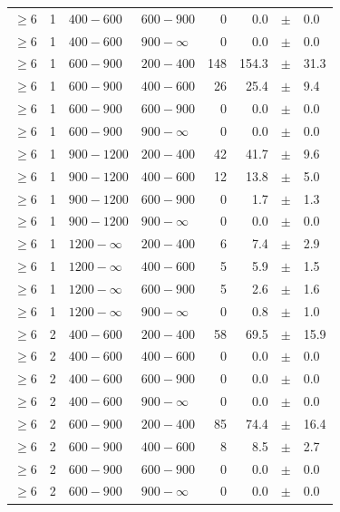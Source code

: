 \begin{table}[!h]
\begin{tabular}{rrllrrcl}
$\geq 6$ & 1 & $ 400- 600$ & $600-900$ &      0 &      0.0 &$\pm$&    0.0 \\
$\geq 6$ & 1 & $ 400- 600$ & $900-\infty$ &      0 &      0.0 &$\pm$&    0.0 \\
$\geq 6$ & 1 & $ 600- 900$ & $200-400$ &    148 &    154.3 &$\pm$&   31.3 \\
$\geq 6$ & 1 & $ 600- 900$ & $400-600$ &     26 &     25.4 &$\pm$&    9.4 \\
$\geq 6$ & 1 & $ 600- 900$ & $600-900$ &      0 &      0.0 &$\pm$&    0.0 \\
$\geq 6$ & 1 & $ 600- 900$ & $900-\infty$ &      0 &      0.0 &$\pm$&    0.0 \\
$\geq 6$ & 1 & $ 900-1200$ & $200-400$ &     42 &     41.7 &$\pm$&    9.6 \\
$\geq 6$ & 1 & $ 900-1200$ & $400-600$ &     12 &     13.8 &$\pm$&    5.0 \\
$\geq 6$ & 1 & $ 900-1200$ & $600-900$ &      0 &      1.7 &$\pm$&    1.3 \\
$\geq 6$ & 1 & $ 900-1200$ & $900-\infty$ &      0 &      0.0 &$\pm$&    0.0 \\
$\geq 6$ & 1 & $1200- \infty$ & $200-400$ &      6 &      7.4 &$\pm$&    2.9 \\
$\geq 6$ & 1 & $1200- \infty$ & $400-600$ &      5 &      5.9 &$\pm$&    1.5 \\
$\geq 6$ & 1 & $1200- \infty$ & $600-900$ &      5 &      2.6 &$\pm$&    1.6 \\
$\geq 6$ & 1 & $1200- \infty$ & $900-\infty$ &      0 &      0.8 &$\pm$&    1.0 \\
$\geq 6$ & 2 & $ 400- 600$ & $200-400$ &     58 &     69.5 &$\pm$&   15.9 \\
$\geq 6$ & 2 & $ 400- 600$ & $400-600$ &      0 &      0.0 &$\pm$&    0.0 \\
$\geq 6$ & 2 & $ 400- 600$ & $600-900$ &      0 &      0.0 &$\pm$&    0.0 \\
$\geq 6$ & 2 & $ 400- 600$ & $900-\infty$ &      0 &      0.0 &$\pm$&    0.0 \\
$\geq 6$ & 2 & $ 600- 900$ & $200-400$ &     85 &     74.4 &$\pm$&   16.4 \\
$\geq 6$ & 2 & $ 600- 900$ & $400-600$ &      8 &      8.5 &$\pm$&    2.7 \\
$\geq 6$ & 2 & $ 600- 900$ & $600-900$ &      0 &      0.0 &$\pm$&    0.0 \\
$\geq 6$ & 2 & $ 600- 900$ & $900-\infty$ &      0 &      0.0 &$\pm$&    0.0 \\

\end{tabular}
\end{table}

